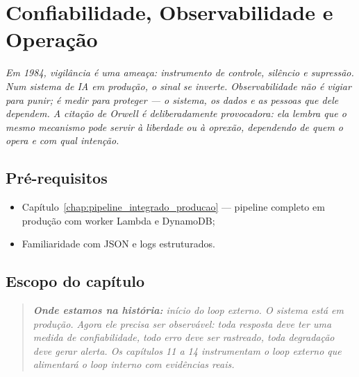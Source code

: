 \chapter{Confiabilidade, Observabilidade e Opera\c{c}\~ao}
\label{chap:confiabilidade_observabilidade}

{\small\itshape\color{AccentGray}
Em \textit{1984}, vigil\^ancia \'{e} uma amea\c{c}a: instrumento de controle, sil\^encio e supress\~ao. Num sistema de IA em produ\c{c}\~ao, o sinal se inverte. Observabilidade n\~ao \'{e} vigiar para punir; \'{e} medir para proteger --- o sistema, os dados e as pessoas que dele dependem. A cita\c{c}\~ao de Orwell \'{e} deliberadamente provocadora: ela lembra que o mesmo mecanismo pode servir \`a liberdade ou \`a oprex\~ao, dependendo de quem o opera e com qual inten\c{c}\~ao.\par}
\vspace{0.6em}
\section{Pr\'e-requisitos}

\begin{itemize}[leftmargin=*]
  \item Cap\'itulo~\ref{chap:pipeline_integrado_producao} --- pipeline
        completo em produ\c{c}\~ao com worker Lambda e DynamoDB;
  \item Familiaridade com JSON e logs estruturados.
\end{itemize}

\section{Escopo do cap\'itulo}

\begin{quote}\itshape
\textbf{Onde estamos na hist\'oria:} in\'icio do loop externo.
O sistema est\'a em produ\c{c}\~ao. Agora ele precisa ser observ\'avel:
toda resposta deve ter uma medida de confiabilidade, todo erro deve
ser rastreado, toda degrada\c{c}\~ao deve gerar alerta. Os cap\'itulos
11 a 14 instrumentam o loop externo que alimentar\'a o loop interno
com evid\^encias reais.
\end{quote}


